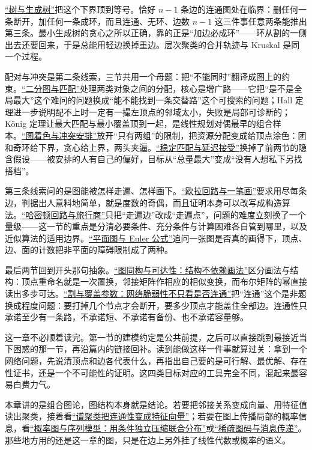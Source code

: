 \hyperref[sec:04-Discrete-Mathematics/03-Graph-Theory/03]{``树与生成树''}把这个下界顶到等号。恰好 \(n-1\) 条边的连通图处在临界：删任何一条断开，加任何一条成环，而且连通、无环、边数 \(n-1\) 这三件事任意两条能推出第三条。最小生成树的贪心之所以正确，靠的正是``加边必成环''——环从割的一侧出去还要回来，于是总能用轻边换掉重边。层次聚类的合并轨迹与 Kruskal 是同一个过程。

配对与冲突是第二条线索，三节共用一个母题：把``不能同时''翻译成图上的约束。\hyperref[sec:04-Discrete-Mathematics/03-Graph-Theory/04]{``二分图与匹配''}处理两类对象之间的分配，核心是增广路——它把``是不是全局最大''这个难问的问题换成``能不能找到一条交替路''这个可搜索的问题；Hall 定理进一步说明配不上时一定有一撮左顶点的邻域太小，失败是局部可诊断的；König 定理让最大匹配与最小覆盖顶到一起，是线性规划对偶最早的组合样本。\hyperref[sec:04-Discrete-Mathematics/03-Graph-Theory/05]{``图着色与冲突安排''}放开``只有两组''的限制，把资源分配变成给顶点涂色：团和奇环给下界，贪心给上界，两头夹逼。\hyperref[sec:04-Discrete-Mathematics/03-Graph-Theory/06]{``稳定匹配与延迟接受''}换掉了前两节的隐含假设——被安排的人有自己的偏好，目标从``总量最大''变成``没有人想私下另找搭档''。

第三条线索问的是图能被怎样走遍、怎样画下。\hyperref[sec:04-Discrete-Mathematics/03-Graph-Theory/07]{``欧拉回路与一笔画''}要求用尽每条边，判据出人意料地简单，就是度数的奇偶，而且证明本身可以改写成构造算法。\hyperref[sec:04-Discrete-Mathematics/03-Graph-Theory/08]{``哈密顿回路与旅行商''}只把``走遍边''改成``走遍点''，问题的难度立刻换了一个量级——这一节的重点是分清必要条件、充分条件与计算困难各自管到哪里，以及近似算法的适用边界。\hyperref[sec:04-Discrete-Mathematics/03-Graph-Theory/09]{``平面图与 Euler 公式''}追问一张图是否真的画得下，顶点、边、面的计数把非平面的障碍限制成了两种。

最后两节回到开头那句抽象。\hyperref[sec:04-Discrete-Mathematics/03-Graph-Theory/10]{``图同构与可达性：结构不依赖画法''}区分画法与结构：顶点重命名就是一次置换，邻接矩阵作相应的相似变换，而布尔矩阵的幂直接读出多步可达。\hyperref[sec:04-Discrete-Mathematics/03-Graph-Theory/11]{``割与覆盖参数：网络脆弱性不只看是否连通''}把``连通''这个是非题换成程度问题：要打掉几个节点才会断开，要多少顶点才能盖住全部边。连通性只承诺至少有一条路，不承诺短、不承诺有备份、也不承诺容量够。

这一章不必顺着读完。第一节的建模约定是公共前提，之后可以直接跳到最接近当下困惑的那一节，再沿篇内的链接回补。读到能做这样一件事就算过关：拿到一个网络问题，先说清顶点和边各代表什么，再指出自己要的是可行解、最优解、存在性证书，还是一个不可能性的证明。这四类目标对应的工具完全不同，混起来最容易白费力气。

本章讲的是组合图论，图结构本身就是结论。若要把邻接关系变成向量、用特征值读出聚类，接着看\hyperref[sec:13-Machine-Learning/05-Clustering-and-Data-Geometry/02]{``谱聚类把连通性变成特征向量''}；若要在图上传播局部的概率信息，看\hyperref[ch:115]{``概率图与序列模型：用条件独立压缩联合分布''}或\hyperref[sec:04-Discrete-Mathematics/05-Coding-and-Polynomial-Methods/04]{``稀疏图码与消息传递''}。那些地方用的还是这一章的图，只是在边上另外挂了线性代数或概率的语义。
